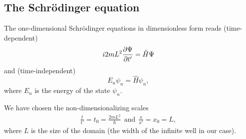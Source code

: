 \subsection*{The Schrödinger equation}
The one-dimensional Schrödinger equations in dimensionless form reads (time-dependent)
\begin{equation}
    i2mL^2\pd{\Psi}{t'} = \hat H \Psi
\end{equation}
and (time-independent)
\begin{equation}
    E_n \psi_n = \hat H \psi_n,
    \label{eq:tise}
\end{equation}
where $E_n$ is the energy of the state $\psi_n$.

We have chosen the non-dimensionalizing scales
\begin{align}
    \frac{t}{t'} = t_0 = \frac{2mL^2}{\hbar} ~~\text{and}~~ \frac{x}{x'} = x_0 = L,
\end{align}
where $L$ is the size of the domain (the width of the infinite well in our case). 




